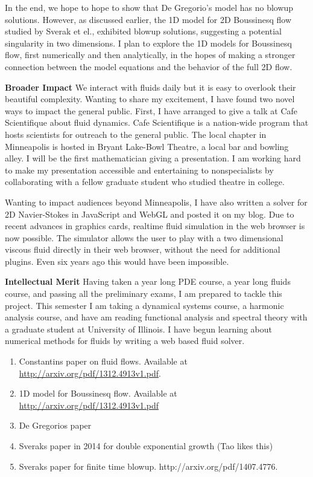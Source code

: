 \documentclass[12pt]{article}
\begin{document}
In the end, we hope to hope to show that De Gregorio's model has no blowup solutions. However, as discussed earlier, the 1D model for 2D Boussinesq flow studied by Sverak et el., exhibited blowup solutions, suggesting a potential singularity in two dimensions. I plan to explore the 1D models for Boussinesq flow, first numerically and then analytically, in the hopes of making a stronger connection between the model equations and the behavior of the full 2D flow.


\textbf{Broader Impact}
We interact with fluids daily but it is easy to overlook their beautiful complexity. Wanting to share my excitement, I have found two novel ways to impact the general public. First, I have arranged to give a talk at Cafe Scientifique about fluid dynamics. Cafe Scientifique is a nation-wide program that hosts scientists for outreach to the general public. The local chapter in Minneapolis is hosted in Bryant Lake-Bowl Theatre, a local bar and bowling alley. I will be the first mathematician giving a presentation. I am working hard to make my presentation accessible and entertaining to nonspecialists by collaborating with a fellow graduate student who studied theatre in college. 

Wanting to impact audiences beyond Minneapolis, I have also written a solver for 2D Navier-Stokes in JavaScript and WebGL and posted it on my blog. Due to recent advances in graphics cards, realtime fluid simulation in the web browser is now possible. The simulator allows the user to play with a two dimensional viscous fluid directly in their web browser, without the need for additional plugins. Even six years ago this would have been impossible. 

\textbf{Intellectual Merit}
Having taken a year long PDE course, a year long fluids course, and passing all the preliminary exams, I am prepared to tackle this project. This semester I am taking a dynamical systems course, a harmonic analysis course, and have am reading functional analysis and spectral theory with a graduate student at University of Illinois. I have begun learning about numerical methods for fluids by writing a web based fluid solver. 

\begin{enumerate}
	\item Constantins paper on fluid flows. Available at \url{http://arxiv.org/pdf/1312.4913v1.pdf}.
	\item 1D model for Boussinesq flow. Available at \url{http://arxiv.org/pdf/1312.4913v1.pdf} 
	\item De Gregorios paper
	\item Sveraks paper in 2014 for double exponential growth (Tao likes this)
	\item Sveraks paper for finite time blowup. http://arxiv.org/pdf/1407.4776.  
\end{enumerate}
\end{document}
